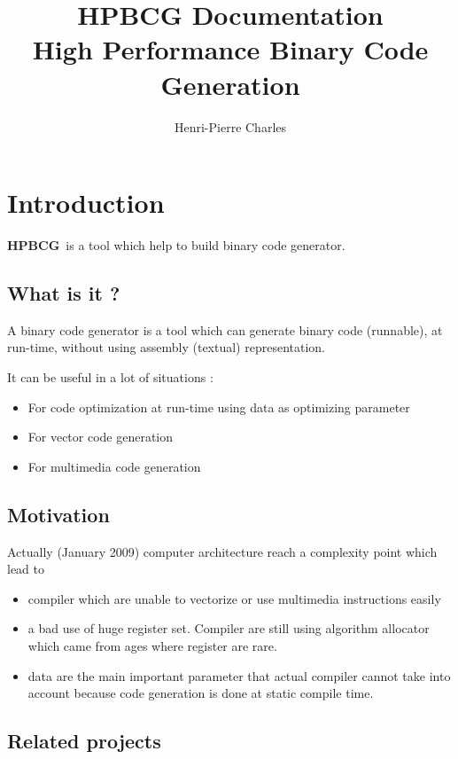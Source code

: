 \documentclass{article}
\title{HPBCG Documentation\\
High Performance Binary Code Generation}
\author{Henri-Pierre Charles}
\newcommand{\hpbcg}{\textbf{HPBCG}\ }
\begin{document}
\maketitle
\tableofcontents{}

\section{Introduction}

\hpbcg is a tool which help to build binary code generator.

\subsection{What is it ?}

A binary code generator is a tool which can generate binary code
(runnable), at run-time, without using assembly (textual)
representation.

It can be useful in a lot of situations :
\begin{itemize}
\item For code optimization at run-time using data as optimizing parameter
\item For vector code generation
\item For multimedia code generation
\end{itemize}

\subsection{Motivation}

Actually (January 2009) computer architecture reach a complexity
point which lead to
\begin{itemize}
\item compiler which are unable to vectorize or use multimedia
  instructions easily
\item a bad use of huge register set. Compiler are still using
  algorithm allocator which came from ages where register are rare.
\item data are the main important parameter that actual compiler
  cannot take into account because code generation is done at static
  compile time.
\end{itemize}

\subsection{Related projects}
\end{document}
